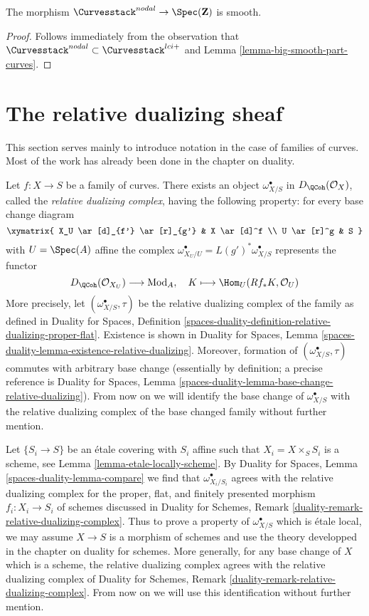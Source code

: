 \begin{lemma}
\label{lemma-nodal-curves-smooth}
The morphism $\Curvesstack^{nodal} \to \Spec(\mathbf{Z})$ is smooth.
\end{lemma}

\begin{proof}
Follows immediately from the observation that
$\Curvesstack^{nodal} \subset \Curvesstack^{lci+}$
and Lemma \ref{lemma-big-smooth-part-curves}.
\end{proof}




\section{The relative dualizing sheaf}
\label{section-relative-dualizing}

\noindent
This section serves mainly
to introduce notation in the case of families of curves.
Most of the work has already been done in the chapter on duality.

\medskip\noindent
Let $f : X \to S$ be a family of curves. There exists an object
$\omega_{X/S}^\bullet$ in $D_\QCoh(\mathcal{O}_X)$,
called the {\it relative dualizing complex}, having the following
property: for every base change diagram
$$
\xymatrix{
X_U \ar[d]_{f'} \ar[r]_{g'} & X \ar[d]^f \\
U \ar[r]^g & S
}
$$
with $U = \Spec(A)$ affine the complex
$\omega_{X_U/U}^\bullet = L(g')^*\omega_{X/S}^\bullet$
represents the functor
$$
D_\QCoh(\mathcal{O}_{X_U}) \longrightarrow \text{Mod}_A,\quad
K \longmapsto \Hom_U(Rf_*K, \mathcal{O}_U)
$$
More precisely, let $(\omega_{X/S}^\bullet, \tau)$
be the relative dualizing complex of the family as defined in
Duality for Spaces, Definition
\ref{spaces-duality-definition-relative-dualizing-proper-flat}.
Existence is shown in Duality for Spaces, Lemma
\ref{spaces-duality-lemma-existence-relative-dualizing}.
Moreover, formation of $(\omega_{X/S}^\bullet, \tau)$ commutes
with arbitrary base change (essentially by definition; a precise
reference is Duality for Spaces, Lemma
\ref{spaces-duality-lemma-base-change-relative-dualizing}).
From now on we will identify the base change of
$\omega_{X/S}^\bullet$ with the relative dualizing
complex of the base changed family without further mention.

\medskip\noindent
Let $\{S_i \to S\}$ be an \'etale covering with $S_i$ affine such that
$X_i = X \times_S S_i$ is a scheme, see Lemma \ref{lemma-etale-locally-scheme}.
By Duality for Spaces, Lemma \ref{spaces-duality-lemma-compare}
we find that $\omega_{X_i/S_i}^\bullet$ agrees with
the relative dualizing complex for the proper, flat, and
finitely presented morphism $f_i : X_i \to S_i$ of schemes
discussed in Duality for Schemes, Remark
\ref{duality-remark-relative-dualizing-complex}.
Thus to prove a property of $\omega_{X/S}^\bullet$
which is \'etale local, we may assume $X \to S$ is a morphism of schemes
and use the theory developped in the chapter on duality for schemes.
More generally, for any base change of $X$ which is a scheme,
the relative dualizing complex agrees with the
relative dualizing complex of Duality for Schemes, Remark
\ref{duality-remark-relative-dualizing-complex}.
From now on we will use this identification without further mention.

